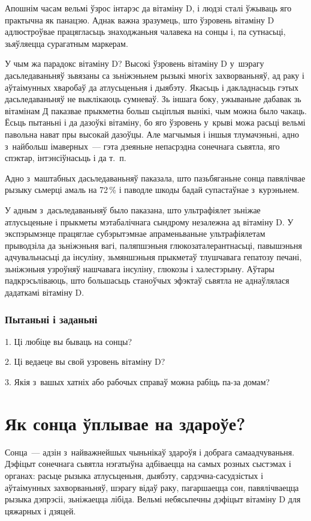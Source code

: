 Апошнім часам вельмі ўзрос інтарэс да вітаміну D, і людзі сталі ўжываць яго практычна як панацэю. Аднак важна зразумець, што ўзровень вітаміну D адлюстроўвае працягласьць знаходжаньня чалавека на сонцы і, па сутнасьці, зьяўляецца сурагатным маркерам.

У чым жа парадокс вітаміну D? Высокі ўзровень вітаміну D у~шэрагу дасьледаваньняў зьвязаны са зьніжэньнем рызыкі многіх захворваньняў, ад раку і аўтаімунных хваробаў да атлусьценьня і дыябэту. Якасьць і дакладнасьць гэтых дасьледаваньняў не выклікаюць сумневаў. Зь іншага боку, ужываньне дабавак зь вітамінам Д паказвае прыкметна больш сьціплыя вынікі, чым можна было чакаць. Ёсьць пытаньні і да дазоўкі вітаміну, бо яго ўзровень у~крыві можа расьці вельмі павольна нават пры высокай дазоўцы. Але магчымыя і іншыя тлумачэньні, адно з~найбольш імаверных~--- гэта дзеяньне непасрэдна сонечнага сьвятла, яго спэктар, інтэнсіўнасьць і да т.~п. 

Адно з~маштабных дасьледаваньняў паказала, што пазьбяганьне сонца павялічвае рызыку сьмерці амаль на 72\,\% і паводле шкоды бадай супастаўнае з~курэньнем.

У адным з~дасьледаваньняў было паказана, што ультрафіялет зьніжае атлусьценьне і прыкметы мэтабалічнага сындрому незалежна ад вітаміну D. У экспэрымэнце працяглае субэрытэмнае апраменьваньне ультрафіялетам прыводзіла да зьніжэньня вагі, паляпшэньня глюкозаталерантнасьці, павышэньня адчувальнасьці да інсуліну, зьмяншэньня прыкметаў тлушчавага гепатозу печані, зьніжэньня узроўняў нашчавага інсуліну, глюкозы і халестэрыну. Аўтары падкрэсьліваюць, што большасьць станоўчых эфэктаў сьвятла не аднаўлялася дадаткамі вітаміну D.

\subsubsection{Пытаньні і заданьні}

1. Ці любіце вы бываць на сонцы?

2. Ці ведаеце вы свой узровень вітаміну D?

3. Якія з~вашых хатніх або рабочых справаў можна рабіць па-за домам?


\section{Як сонца ўплывае на здароўе?}

Сонца~--- адзін з~найважнейшых чыньнікаў здароўя і добрага самаадчуваньня. Дэфіцыт сонечнага сьвятла нэгатыўна адбіваецца на самых розных сыстэмах і органах: расьце рызыка атлусьценьня, дыябэту, сардэчна-сасудзістых і аўтаімунных захворваньняў, шэрагу відаў раку, пагаршаецца сон, павялічваецца рызыка дэпрэсіі, зьніжаецца лібіда. Вельмі небясьпечны дэфіцыт вітаміну D для цяжарных і дзяцей.

